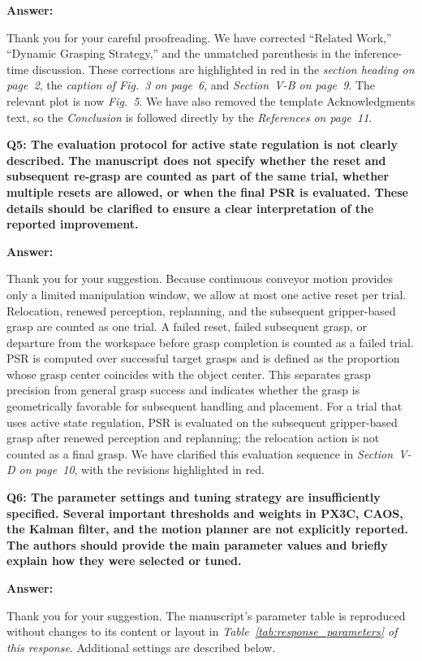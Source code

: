 \documentclass[journal,10pt]{IEEEtran}
\newcommand{\question}[2]{%
  \par\smallskip\noindent
  {\color{responseblue}\bfseries\clubpenalty=10000\widowpenalty=10000 Q#1: #2\par}%
  \par\nobreak\noindent
}
\newcommand{\answer}{%
  \par\smallskip\noindent
  \textbf{Answer: }\ignorespaces
}
\begin{document}
\answer
Thank you for your careful proofreading. We have corrected ``Related Work,'' ``Dynamic Grasping Strategy,'' and the unmatched parenthesis in the inference-time discussion. These corrections are highlighted in red in the \textit{section heading on page~2}, the \textit{caption of Fig.~3 on page~6}, and \textit{Section~V-B on page~9}. The relevant plot is now \textit{Fig.~5}. We have also removed the template Acknowledgments text, so the \textit{Conclusion} is followed directly by the \textit{References on page~11}.

\question{5}{The evaluation protocol for active state regulation is not clearly described.
The manuscript does not specify whether the reset and subsequent re-grasp are counted as part of the same trial, whether multiple resets are allowed, or when the final PSR is evaluated. These details should be clarified to ensure a clear interpretation of the reported improvement.}

\answer
Thank you for your suggestion. Because continuous conveyor motion provides only a limited manipulation window, we allow at most one active reset per trial. Relocation, renewed perception, replanning, and the subsequent gripper-based grasp are counted as one trial. A failed reset, failed subsequent grasp, or departure from the workspace before grasp completion is counted as a failed trial. PSR is computed over successful target grasps and is defined as the proportion whose grasp center coincides with the object center. This separates grasp precision from general grasp success and indicates whether the grasp is geometrically favorable for subsequent handling and placement. For a trial that uses active state regulation, PSR is evaluated on the subsequent gripper-based grasp after renewed perception and replanning; the relocation action is not counted as a final grasp. We have clarified this evaluation sequence in \textit{Section~V-D on page~10}, with the revisions highlighted in red.

\question{6}{The parameter settings and tuning strategy are insufficiently specified.
Several important thresholds and weights in PX3C, CAOS, the Kalman filter, and the motion planner are not explicitly reported. The authors should provide the main parameter values and briefly explain how they were selected or tuned.}

\answer
Thank you for your suggestion. The manuscript's parameter table is reproduced without changes to its content or layout in \textit{Table~\ref{tab:response_parameters} of this response}. Additional settings are described below.
\end{document}

